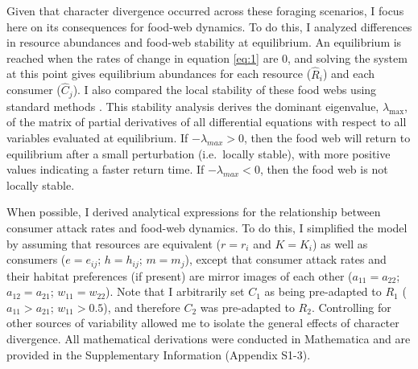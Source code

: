 \documentclass[11pt,]{article}
\begin{document}
Given that character divergence occurred across these foraging
scenarios, I focus here on its consequences for food-web dynamics. To do
this, I analyzed differences in resource abundances and food-web
stability at equilibrium. An equilibrium is reached when the rates of
change in equation \ref{eq:1} are 0, and solving the system at this
point gives equilibrium abundances for each resource (\(\hat R_i\)) and
each consumer (\(\hat C_j\)). I also compared the local stability of
these food webs using standard methods \citep{Otto2007}. This stability
analysis derives the dominant eigenvalue, \(\lambda_{\text{max}}\), of
the matrix of partial derivatives of all differential equations with
respect to all variables evaluated at equilibrium. If
\(-\lambda_{max}>0\), then the food web will return to equilibrium after
a small perturbation (i.e.~locally stable), with more positive values
indicating a faster return time. If \(-\lambda_{max}<0\), then the food
web is not locally stable.

When possible, I derived analytical expressions for the relationship
between consumer attack rates and food-web dynamics. To do this, I
simplified the model by assuming that resources are equivalent
(\(r=r_i\) and \(K=K_i\)) as well as consumers (\(e=e_{ij}\);
\(h=h_{ij}\); \(m=m_j\)), except that consumer attack rates and their
habitat preferences (if present) are mirror images of each other
(\(a_{11}=a_{22}\); \(a_{12}=a_{21}\); \(w_{11}=w_{22}\)). Note that I
arbitrarily set \(C_1\) as being pre-adapted to \(R_1\)
(\(a_{11} > a_{21}\); \(w_{11} > 0.5\)), and therefore \(C_2\) was
pre-adapted to \(R_2\). Controlling for other sources of variability
allowed me to isolate the general effects of character divergence. All
mathematical derivations were conducted in Mathematica
\citep{Mathematica} and are provided in the Supplementary Information
(Appendix S1-3).
\end{document}
